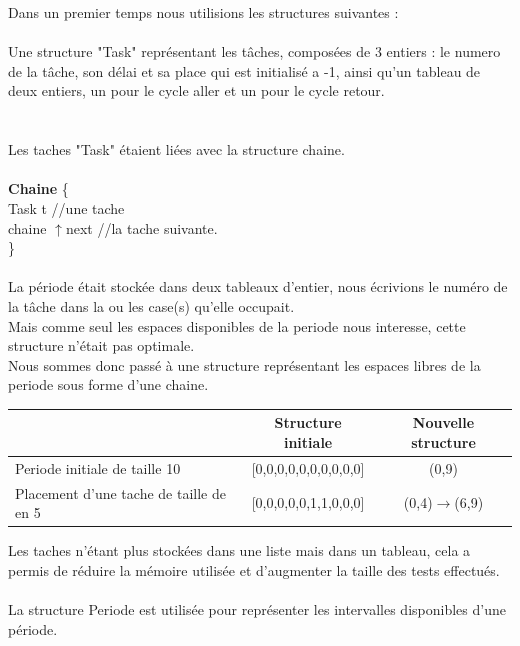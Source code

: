 \documentclass[11pt]{article}
\begin{document}
Dans un premier temps nous utilisions les structures suivantes :\\\\
Une structure "Task" représentant les tâches, composées de 3 entiers : le numero de la tâche, son délai et sa place qui est initialisé a -1, ainsi qu'un tableau de deux entiers, un pour le cycle aller et un pour le cycle retour.\\ 
\\\\
Les taches "Task" étaient liées avec la structure chaine.\\\\
\indent \textbf{Chaine} \{ \\
    \indent \indent Task t   \indent \indent \indent //une tache\\
    \indent \indent chaine $\uparrow$next \indent //la tache suivante.\\
\indent\}
\\\\
\indent La période était stockée dans deux tableaux d'entier, nous écrivions le numéro de la tâche dans la ou les case(s) qu'elle occupait.\\
Mais comme seul les espaces disponibles de la periode nous interesse, cette structure n'était pas optimale.\\
Nous sommes donc passé à une structure représentant les espaces libres de la periode sous forme d'une chaine.
\begin{center}
    \begin{tabular}{|l|c|c|}			
    \hline                                              & \textbf{Structure initiale}   & \textbf{Nouvelle structure} \\
    \hline 	Periode initiale de taille 10               & [0,0,0,0,0,0,0,0,0,0]         &(0,9)		     \\
    \hline 	Placement d'une tache de taille de en 5 	& [0,0,0,0,0,1,1,0,0,0] 		& (0,4)$\rightarrow$(6,9)   \\
    \hline
    \end{tabular}\vspace{1em}
\end{center}
\noindent Les taches n'étant plus stockées dans une liste mais dans un tableau, cela a permis de réduire la mémoire utilisée et d'augmenter la taille des tests effectués.\\\\
La structure Periode est utilisée pour représenter les intervalles disponibles d'une période.\\\\
\end{document}
